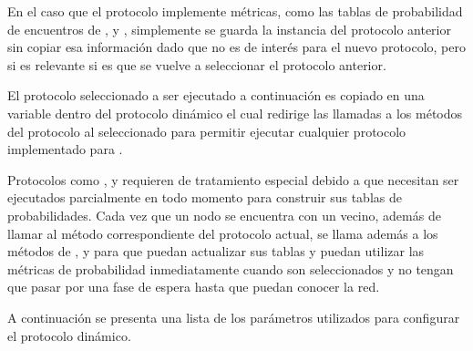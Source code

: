 En el caso que el protocolo implemente métricas, como las tablas de probabilidad
de encuentros de \maxprop, \prophet{} y \syf, simplemente se guarda la instancia
del protocolo anterior sin copiar esa información dado que no es de interés para
el nuevo protocolo, pero si es relevante si es que se vuelve a seleccionar el
protocolo anterior.

El protocolo seleccionado a ser ejecutado a continuación es copiado en una
variable dentro del protocolo dinámico el cual redirige las llamadas a los
métodos del protocolo al seleccionado para permitir ejecutar cualquier protocolo
implementado para \theone.

Protocolos como \maxprop, \syf{} y \prophet{} requieren de tratamiento especial
debido a que necesitan ser ejecutados parcialmente en todo momento para
construir sus tablas de probabilidades. Cada vez que un nodo se encuentra con un
vecino, además de llamar al método correspondiente del protocolo actual, se
llama además a los métodos de \maxprop, \syf{} y \prophet{} para que puedan
actualizar sus tablas y puedan utilizar las métricas de probabilidad
inmediatamente cuando son seleccionados y no tengan que pasar por una fase de
espera hasta que puedan conocer la red.




A continuación se presenta una lista de los parámetros utilizados para
configurar el protocolo dinámico.

